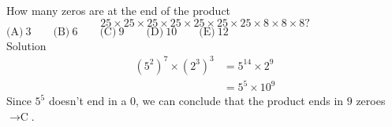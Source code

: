 

How many zeros are at the end of the product \[25\times 25\times 25\times 25\times 25\times 25\times 25\times 8\times 8\times 8?\]
$\text{(A)}\ 3 \qquad \text{(B)}\ 6 \qquad \text{(C)}\ 9 \qquad \text{(D)}\ 10 \qquad \text{(E)}\ 12$
\\
Solution
\\
\begin{align*} (5^2)^7\times (2^3)^3 &=  5^{14}\times 2^{9} \\ &= 5^5\times 10^9  \end{align*} Since $5^5$ doesn't end in a $0$, we can conclude that the product ends in $9$ zeroes $\rightarrow \boxed{\text{C}}$.
